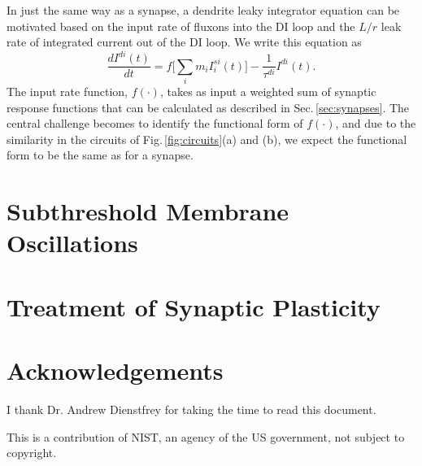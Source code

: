 \documentclass[]{article}
\begin{document}
In just the same way as a synapse, a dendrite leaky integrator equation can be motivated based on the input rate of fluxons into the DI loop and the $L/r$ leak rate of integrated current out of the DI loop. We write this equation as 
\begin{equation}
\label{eq:I_dr}
\frac{dI^{di}(t)}{dt} = f\bigg[\sum_i m_i I_i^{si}(t)\bigg]-\frac{1}{\tau^{di}}I^{di}(t).
\end{equation}
The input rate function, $f(\cdot)$, takes as input a weighted sum of synaptic response functions that can be calculated as described in Sec.\,\ref{sec:synapses}. The central challenge becomes to identify the functional form of $f(\cdot)$, and due to the similarity in the circuits of Fig.\,\ref{fig:circuits}(a) and (b), we expect the functional form to be the same as for a synapse.

\section{\label{sec:subthreshold_oscillations}Subthreshold Membrane Oscillations}

\section{\label{sec:synaptic_plasticity}Treatment of Synaptic Plasticity}


\section{Acknowledgements}
I thank Dr. Andrew Dienstfrey for taking the time to read this document.

\vspace{0.5em}
\noindent This is a contribution of NIST, an agency of the US government, not subject to copyright.
	
\newpage
\appendix




\end{document}
